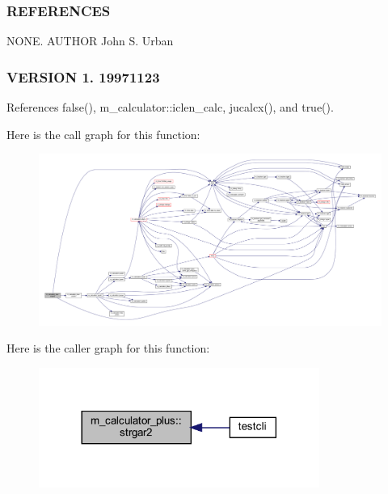 \subsubsection*{R\+E\+F\+E\+R\+E\+N\+C\+ES}

N\+O\+NE. A\+U\+T\+H\+OR John S. Urban \subsubsection*{V\+E\+R\+S\+I\+ON 1. 19971123}

References false(), m\+\_\+calculator\+::iclen\+\_\+calc, jucalcx(), and true().

Here is the call graph for this function\+:
\nopagebreak
\begin{figure}[H]
\begin{center}
\leavevmode
\includegraphics[width=350pt]{namespacem__calculator__plus_a59710eb6babeed1f4b8d439f97d5d90a_cgraph}
\end{center}
\end{figure}
Here is the caller graph for this function\+:
\nopagebreak
\begin{figure}[H]
\begin{center}
\leavevmode
\includegraphics[width=260pt]{namespacem__calculator__plus_a59710eb6babeed1f4b8d439f97d5d90a_icgraph}
\end{center}
\end{figure}
\mbox{\label{namespacem__calculator__plus_a4d3424e0cb74d4af53e7f59c07d31f1b}} 
